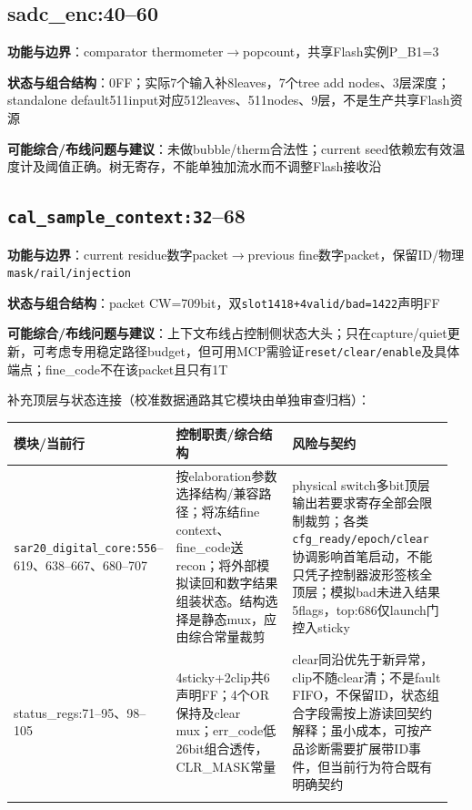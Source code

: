\documentclass[UTF8,fontset=fandol,10pt,a4paper,openany]{ctexrep}
\newcommand{\code}[1]{\nolinkurl{#1}}
\begin{document}
\subsection*{sadc\_enc:40–60}
\noindent\textbf{功能与边界}：comparator thermometer\ensuremath{\rightarrow}popcount，共享Flash实例P\_B1=3\par
\noindent\textbf{状态与组合结构}：0FF；实际7个输入补8leaves，7个tree add nodes、3层深度；standalone default511input对应512leaves、511nodes、9层，不是生产共享Flash资源\par
\noindent\textbf{可能综合/布线问题与建议}：未做bubble/therm合法性；current seed依赖宏有效温度计及阈值正确。树无寄存，不能单独加流水而不调整Flash接收沿\par
\subsection*{\code{cal_sample_context:32}–68}
\noindent\textbf{功能与边界}：current residue数字packet\ensuremath{\rightarrow}previous fine数字packet，保留ID/物理\code{mask/rail/injection}\par
\noindent\textbf{状态与组合结构}：packet CW=709bit，双\code{slot1418+4valid/bad=1422}声明FF\par
\noindent\textbf{可能综合/布线问题与建议}：上下文布线占控制侧状态大头；只在capture/quiet更新，可考虑专用稳定路径budget，但可用MCP需验证\code{reset/clear/enable}及具体端点；fine\_code不在该packet且只有1T\par


补充顶层与状态连接（校准数据通路其它模块由单独审查归档）：


\begingroup\small\setlength{\tabcolsep}{2pt}\renewcommand{\arraystretch}{1.25}\begin{longtable}{@{}>{\raggedright\arraybackslash}p{0.25\linewidth}>{\raggedright\arraybackslash}p{0.32\linewidth}>{\raggedright\arraybackslash}p{0.39\linewidth}@{}}
\toprule
\textbf{模块/当前行} & \textbf{控制职责/综合结构} & \textbf{风险与契约}\\\midrule\endhead
\code{sar20_digital_core:556}–619、638–667、680–707 & 按elaboration参数选择结构/兼容路径；将冻结fine context、fine\_code送recon；将外部模拟读回和数字结果组装状态。结构选择是静态mux，应由综合常量裁剪 & physical switch多bit顶层输出若要求寄存全部会限制裁剪；各类\code{cfg_ready/epoch/clear}协调影响首笔启动，不能只凭子控制器波形签核全顶层；模拟bad未进入结果5flags，top:686仅launch门控入sticky\\\addlinespace[2pt]
status\_regs:71–95、98–105 & 4sticky+2clip共6声明FF；4个OR保持及clear mux；err\_code低26bit组合透传，CLR\_MASK常量 & clear同沿优先于新异常，clip不随clear清；不是fault FIFO，不保留ID，状态组合字段需按上游读回契约解释；虽小成本，可按产品诊断需要扩展带ID事件，但当前行为符合既有明确契约\\\addlinespace[2pt]
\bottomrule\end{longtable}\endgroup
\end{document}
